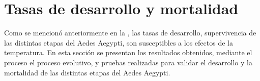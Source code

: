 \section{Tasas de desarrollo y mortalidad}

Como se mencionó anteriormente en la , las tasas de desarrollo,
supervivencia de las distintas etapas del Aedes Aegypti, son susceptibles a los efectos de la
temperatura. En esta sección se presentan los resultados obtenidos, mediante el proceso el proceso
evolutivo, y pruebas realizadas para validar el desarrollo y la mortalidad de las distintas etapas del
Aedes Aegypti.







